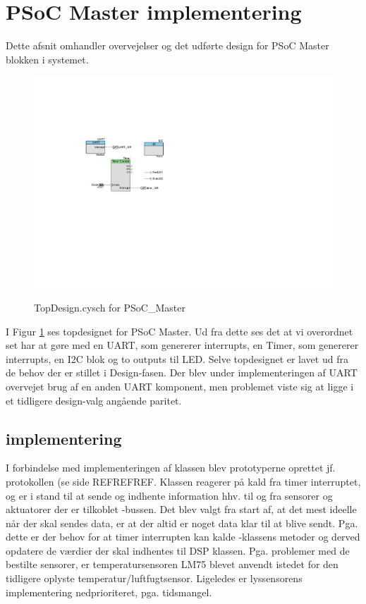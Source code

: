\section{PSoC Master implementering} \label{sec:PSoC_Master_impl}

Dette afsnit omhandler overvejelser og det udførte design for PSoC Master blokken i systemet.

\begin{figure}[h]
\centering
\includegraphics[width=\textwidth*3/5, trim=145 270 475 170, clip=true]{../fig/TopDesign_PSoC_Master}
\label{fig:psoc_master_topdesign}
\caption{TopDesign.cysch for PSoC\_Master}
\end{figure}

I Figur \ref{fig:psoc_master_topdesign} ses topdesignet for PSoC Master. Ud fra dette ses det at vi overordnet set har at gøre med en UART, som genererer interrupts, en Timer, som genererer interrupts, en I2C blok og to outputs til LED. 
Selve topdesignet er lavet ud fra de behov der er stillet i Design-fasen. Der blev under implementeringen af UART overvejet brug af en anden UART komponent, men problemet viste sig at ligge i et tidligere design-valg angående paritet.

\clearpage

\subsection{\IIC implementering}
I forbindelse med implementeringen af \IIC klassen blev prototyperne oprettet jf. \IIC protokollen (se side REFREFREF. 
Klassen reagerer på kald fra timer interruptet, og er i stand til at sende og indhente information hhv. til og fra sensorer og aktuatorer der er tilkoblet \IIC-bussen. 
Det blev valgt fra start af, at det mest ideelle når der skal sendes data, er at der altid er noget data klar til at blive sendt. 
Pga. dette er der behov for at timer interrupten kan kalde \IIC-klassens metoder og derved opdatere de værdier der skal indhentes til DSP klassen. Pga. problemer med de bestilte sensorer, er temperatursensoren LM75 blevet anvendt istedet for den tidligere oplyste temperatur/luftfugtsensor. Ligeledes er lyssensorens implementering nedprioriteret, pga. tidsmangel. 

